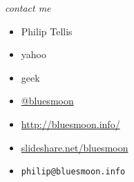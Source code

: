 \documentclass{beamer}
\begin{document}
\begin{frame}{\textit{contact me}}
  \begin{itemize}
  \item Philip Tellis
  \item yahoo
  \item geek
  \item \href{http://twitter.com/bluesmoon}{@bluesmoon}
  \item \href{http://bluesmoon.info/}{http://bluesmoon.info/}
  \item \href{http://www.slideshare.net/bluesmoon}{slideshare.net/bluesmoon}
  \item \small{\texttt{philip@bluesmoon.info}}
  \end{itemize}
\end{frame}
\end{document}
